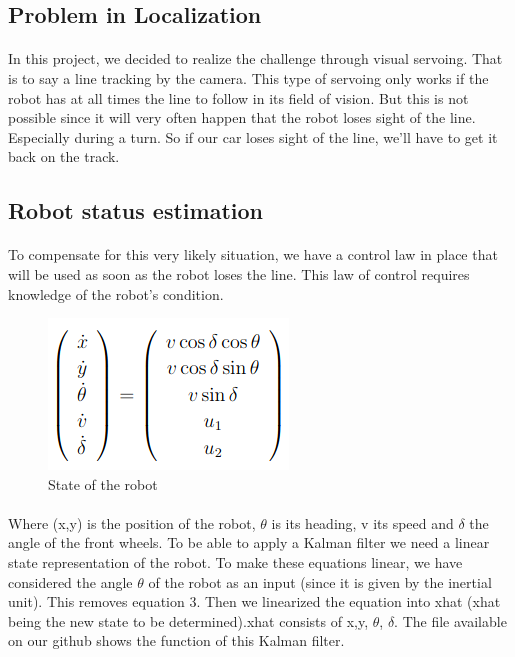 \subsection{Problem in Localization}

\paragraph{}
In this project, we decided to realize the challenge through visual servoing.
That is to say a line tracking by the camera. This type of servoing only
works if the robot has at all times the line to follow in its field of vision. 
But this is not possible since it will very often happen that the robot loses sight of the line. Especially during a turn. So if our car loses sight of the line, we'll have to get it back on the track.


\paragraph{}

\subsection{Robot status estimation}

\paragraph{}
To compensate for this very likely situation, 
we have a control law in place that will be used as soon as the robot loses the line. 
This law of control requires knowledge of the robot's condition.

\begin{figure}[!ht]
    \begin{center}
        \includegraphics[scale=0.6]{Images/Etat_tricycle.png}
    \end{center}
    \caption{State of the robot}
    \label{fig:State}
\end{figure}

\paragraph{}
Where (x,y) is the position of the robot, $\theta$ is its heading, v its speed and $\delta$ the angle of the front wheels.
To be able to apply a Kalman filter we need a linear state representation of the robot. To make these equations linear, 
we have considered the angle $\theta$ of the robot as an input (since it is given by the inertial unit). 
This removes equation 3. Then we linearized the equation into xhat (xhat being the new state to be determined).xhat consists of x,y, $\theta$, $\delta$. 
The file  available on our github shows the function of this Kalman filter.


